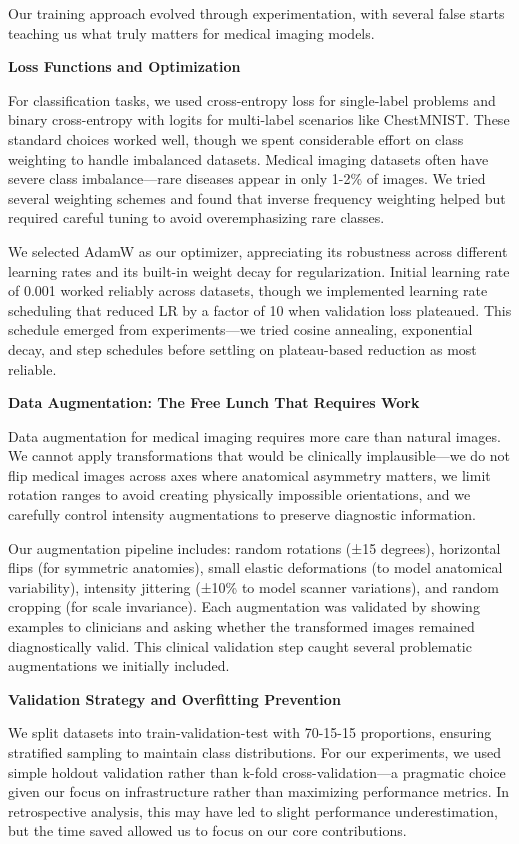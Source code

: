 \documentclass[12pt,a4paper]{article}
\begin{document}
Our training approach evolved through experimentation, with several false starts teaching us what truly matters for medical imaging models.

\textbf{Loss Functions and Optimization}

For classification tasks, we used cross-entropy loss for single-label problems and binary cross-entropy with logits for multi-label scenarios like ChestMNIST. These standard choices worked well, though we spent considerable effort on class weighting to handle imbalanced datasets. Medical imaging datasets often have severe class imbalance—rare diseases appear in only 1-2\% of images. We tried several weighting schemes and found that inverse frequency weighting helped but required careful tuning to avoid overemphasizing rare classes.

We selected AdamW as our optimizer, appreciating its robustness across different learning rates and its built-in weight decay for regularization. Initial learning rate of 0.001 worked reliably across datasets, though we implemented learning rate scheduling that reduced LR by a factor of 10 when validation loss plateaued. This schedule emerged from experiments—we tried cosine annealing, exponential decay, and step schedules before settling on plateau-based reduction as most reliable.

\textbf{Data Augmentation: The Free Lunch That Requires Work}

Data augmentation for medical imaging requires more care than natural images. We cannot apply transformations that would be clinically implausible—we do not flip medical images across axes where anatomical asymmetry matters, we limit rotation ranges to avoid creating physically impossible orientations, and we carefully control intensity augmentations to preserve diagnostic information.

Our augmentation pipeline includes: random rotations (±15 degrees), horizontal flips (for symmetric anatomies), small elastic deformations (to model anatomical variability), intensity jittering (±10\% to model scanner variations), and random cropping (for scale invariance). Each augmentation was validated by showing examples to clinicians and asking whether the transformed images remained diagnostically valid. This clinical validation step caught several problematic augmentations we initially included.

\textbf{Validation Strategy and Overfitting Prevention}

We split datasets into train-validation-test with 70-15-15 proportions, ensuring stratified sampling to maintain class distributions. For our experiments, we used simple holdout validation rather than k-fold cross-validation—a pragmatic choice given our focus on infrastructure rather than maximizing performance metrics. In retrospective analysis, this may have led to slight performance underestimation, but the time saved allowed us to focus on our core contributions.
\end{document}
